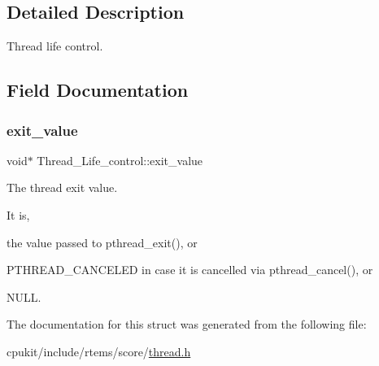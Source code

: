 \subsection{Detailed Description}
Thread life control. 

\subsection{Field Documentation}
\mbox{\label{structThread__Life__control_aeca7bfde1f39da333d910c7c26a50224}} 
\subsubsection{\texorpdfstring{exit\_value}{exit\_value}}
{\footnotesize\ttfamily void$\ast$ Thread\+\_\+\+Life\+\_\+control\+::exit\+\_\+value}



The thread exit value. 

It is,
\begin{DoxyItemize}
\item the value passed to pthread\+\_\+exit(), or
\item P\+T\+H\+R\+E\+A\+D\+\_\+\+C\+A\+N\+C\+E\+L\+ED in case it is cancelled via pthread\+\_\+cancel(), or
\item N\+U\+LL. 
\end{DoxyItemize}

The documentation for this struct was generated from the following file\+:\begin{DoxyCompactItemize}
\item 
cpukit/include/rtems/score/\mbox{\hyperlink{score_2thread_8h}{thread.\+h}}\end{DoxyCompactItemize}
